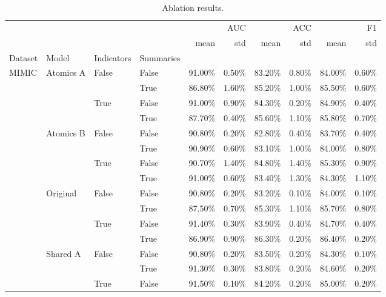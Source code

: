 \begin{table}[h]
\caption{Ablation results.}
\label{ablation_per_dataset}
\begin{tabular}{llllrrrrrr}
\toprule
 &  &  &  & \multicolumn{2}{r}{AUC} & \multicolumn{2}{r}{ACC} & \multicolumn{2}{r}{F1} \\
 &  &  &  & mean & std & mean & std & mean & std \\
Dataset & Model & Indicators & Summaries &  &  &  &  &  &  \\
\midrule
\multirow[t]{20}{*}{MIMIC} & \multirow[t]{4}{*}{Atomics A} & \multirow[t]{2}{*}{False} & False & 91.00\% & 0.50\% & 83.20\% & 0.80\% & 84.00\% & 0.60\% \\
 &  &  & True & 86.80\% & 1.60\% & 85.20\% & 1.00\% & 85.50\% & 0.60\% \\
\cline{3-10}
 &  & \multirow[t]{2}{*}{True} & False & 91.00\% & 0.90\% & 84.30\% & 0.20\% & 84.90\% & 0.40\% \\
 &  &  & True & 87.70\% & 0.40\% & 85.60\% & 1.10\% & 85.80\% & 0.70\% \\
\cline{2-10} \cline{3-10}
 & \multirow[t]{4}{*}{Atomics B} & \multirow[t]{2}{*}{False} & False & 90.80\% & 0.20\% & 82.80\% & 0.40\% & 83.70\% & 0.40\% \\
 &  &  & True & 90.90\% & 0.60\% & 83.10\% & 1.00\% & 84.00\% & 0.80\% \\
\cline{3-10}
 &  & \multirow[t]{2}{*}{True} & False & 90.70\% & 1.40\% & 84.80\% & 1.40\% & 85.30\% & 0.90\% \\
 &  &  & True & 91.00\% & 0.60\% & 83.40\% & 1.30\% & 84.30\% & 1.10\% \\
\cline{2-10} \cline{3-10}
 & \multirow[t]{4}{*}{Original} & \multirow[t]{2}{*}{False} & False & 90.80\% & 0.20\% & 83.20\% & 0.10\% & 84.00\% & 0.10\% \\
 &  &  & True & 87.50\% & 0.70\% & 85.30\% & 1.10\% & 85.70\% & 0.80\% \\
\cline{3-10}
 &  & \multirow[t]{2}{*}{True} & False & 91.40\% & 0.30\% & 83.90\% & 0.40\% & 84.70\% & 0.40\% \\
 &  &  & True & 86.90\% & 0.90\% & 86.30\% & 0.20\% & 86.40\% & 0.20\% \\
\cline{2-10} \cline{3-10}
 & \multirow[t]{4}{*}{Shared A} & \multirow[t]{2}{*}{False} & False & 90.80\% & 0.20\% & 83.50\% & 0.20\% & 84.30\% & 0.10\% \\
 &  &  & True & 91.30\% & 0.30\% & 83.80\% & 0.20\% & 84.60\% & 0.20\% \\
\cline{3-10}
 &  & \multirow[t]{2}{*}{True} & False & 91.50\% & 0.10\% & 84.20\% & 0.20\% & 85.00\% & 0.20\% \\

\end{tabular}
\end{table}
